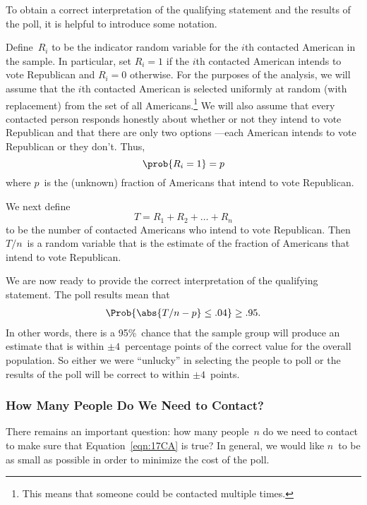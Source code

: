\begin{editingnotes}
To obtain a correct interpretation of the qualifying statement and the
results of the poll, it is helpful to introduce some notation.

Define~$R_i$ to be the indicator random variable for the $i$th
contacted American in the sample.  In particular, set $R_i = 1$ if the
$i$th contacted American intends to vote Republican and $R_i = 0$
otherwise.  For the purposes of the analysis, we will assume that the
$i$th contacted American is selected uniformly at random (with
replacement) from the set of all Americans.\footnote{This means that
someone could be contacted multiple times.}  We will also assume
that every contacted person responds honestly about whether or not
they intend to vote Republican and that there are only two
options ---each American intends to vote Republican or they don't.
Thus,
\begin{equation}
    \prob{R_i = 1} = p
\end{equation}
where $p$~is the (unknown) fraction of Americans that intend to vote
Republican.

We next define
\begin{equation*}
    T = R_1 + R_2 + \dots + R_n
\end{equation*}
to be the number of contacted Americans who intend to vote
Republican.  Then $T/n$~is a random variable that is the estimate of
the fraction of Americans that intend to vote Republican.

We are now ready to provide the correct interpretation of the
qualifying statement.  The poll results mean that
\begin{equation}\label{eqn:17CA}
    \Prob{\strut \abs{T/n - p} \le .04} \ge .95.
\end{equation}
In other words, there is a 95\%~chance that the sample group will
produce an estimate that is within $\pm 4$~percentage points of the
correct value for the overall population.  So either we were
``unlucky'' in selecting the people to poll or the results of the poll
will be correct to within $\pm 4$~points.

\subsubsection{How Many People Do We Need to Contact?}

There remains an important question: how many people~$n$ do we need to
contact to make sure that Equation~\ref{eqn:17CA} is true?  In
general, we would like $n$~to be as small as possible in order to
minimize the cost of the poll.


\end{editingnotes}

